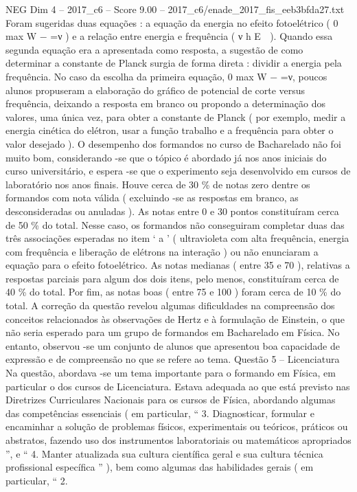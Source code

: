 \begin{textsample}{NEG Dim 4 – 2017\_c6 – Score 9.00 – 2017\_c6/enade\_2017\_fis\_eeb3bfda27.txt}
Foram sugeridas duas equações : a equação da energia no efeito fotoelétrico ( 0 max W − =ν ) e a relação entre energia e frequência ( ν h E  ).
Quando essa segunda equação era a apresentada como resposta, a sugestão de como determinar a constante de Planck surgia de forma direta : dividir a energia pela frequência.
No caso da escolha da primeira equação, 0 max W − =ν, poucos alunos propuseram a elaboração do gráfico de potencial de corte versus frequência, deixando a resposta em branco ou propondo a determinação dos valores, uma única vez, para obter a constante de Planck ( por exemplo, medir a energia cinética do elétron, usar a função trabalho e a frequência para obter o valor desejado ).
O desempenho dos formandos no curso de Bacharelado não foi muito bom, considerando -se que o tópico é abordado já nos anos iniciais do curso universitário, e espera -se que o experimento seja desenvolvido em cursos de laboratório nos anos finais.
Houve cerca de 30 \% de notas zero dentre os formandos com nota válida ( excluindo -se as respostas em branco, as desconsideradas ou anuladas ).
As notas entre 0 e 30 pontos constituíram cerca de 50 \% do total.
Nesse caso, os formandos não conseguiram completar duas das três associações esperadas no item ‘ a ’ ( ultravioleta com alta frequência, energia com frequência e liberação de elétrons na interação ) ou não enunciaram a equação para o efeito fotoelétrico.
As notas medianas ( entre 35 e 70 ), relativas a respostas parciais para algum dos dois itens, pelo menos, constituíram cerca de 40 \% do total.
Por fim, as notas boas ( entre 75 e 100 ) foram cerca de 10 \% do total.
A correção da questão revelou algumas dificuldades na compreensão dos conceitos relacionados às observações de Hertz e à formulação de Einstein, o que não seria esperado para um grupo de formandos em Bacharelado em Física.
No entanto, observou -se um conjunto de alunos que apresentou boa capacidade de expressão e de compreensão no que se refere ao tema.
Questão 5 – Licenciatura Na questão, abordava -se um tema importante para o formando em Física, em particular o dos cursos de Licenciatura.
Estava adequada ao que está previsto nas Diretrizes Curriculares Nacionais para os cursos de Física, abordando algumas das competências essenciais ( em particular, “ 3.
Diagnosticar, formular e encaminhar a solução de problemas físicos, experimentais ou teóricos, práticos ou abstratos, fazendo uso dos instrumentos laboratoriais ou matemáticos apropriados ”, e “ 4.
Manter atualizada sua cultura científica geral e sua cultura técnica profissional específica ” ), bem como algumas das habilidades gerais ( em particular, “ 2.

\end{textsample}
